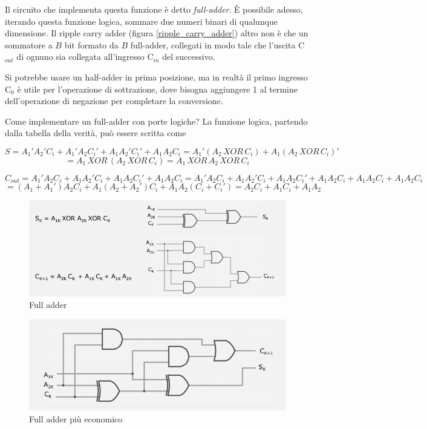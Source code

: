 \documentclass{article}
\begin{document}
Il circuito che implementa questa funzione è detto \textit{full-adder}. È possibile adesso, iterando questa funzione logica, sommare due numeri binari di qualunque dimensione. Il ripple carry adder (figura \ref{ripple_carry_adder}) altro non è che un sommatore a $B$ bit formato da $B$ full-adder, collegati in modo tale che l'uscita C$_{out}$ di ognuno sia collegata all'ingresso C$_{in}$ del successivo.

\vspace{3mm}

Si potrebbe usare un half-adder in prima posizione, ma in realtà il primo ingresso C$_0$ è utile per l'operazione di sottrazione, dove bisogna aggiungere 1 al termine dell'operazione di negazione per completare la conversione.

\vspace{3mm}

Come implementare un full-adder con porte logiche? La funzione logica, partendo dalla tabella della verità, può essere scritta come

\[S = A_1' A_2' C_i + A_1' A_2 C_i' + A_1 A_2' C_i' + A_1 A_2 C_i = A_1' (A_2 \, XOR \, C_i) + A_1 (A_2 \, XOR \, C_i)'\]
\[= A_1 \, XOR \, (A_2 \, XOR \, C_i) = A_1 \, XOR \, A_2 \, XOR \, C_i\]

\[C_{out} = A_1' A_2 C_i + A_1 A_2' C_i + A_1 A_2 C_i' + A_1 A_2 C_i = A_1' A_2 C_i + A_1 A_2' C_i + A_1 A_2 C_i' + A_1 A_2 C_i + A_1 A_2 C_i + A_1 A_2 C_i\]
\[= (A_1 + A_1')A_2 C_i + A_1(A_2 + A_2')C_i + A_1 A_2 (C_i + C_i') = A_2 C_i + A_1 C_i + A_1 A_2\]

\begin{figure}[h]
  \centering
  \includegraphics[scale=0.6]{IM_full_adder}
  \caption{Full adder}
  \label{full_adder}
\end{figure}

\begin{figure}[h]
  \centering
  \includegraphics[scale=0.6]{IM_full_adder_bis}
  \caption{Full adder più economico}
  \label{full_adder_bis}
\end{figure}
\end{document}
